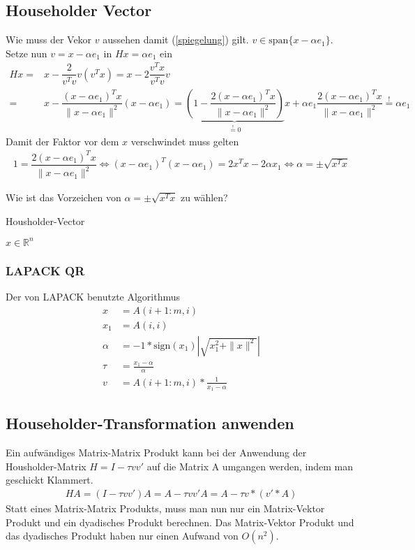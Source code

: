 \subsection{Householder Vector}
Wie muss der Vekor $v$ aussehen damit (\ref{spiegelung}) gilt. $v \in \text{span}\{x - \alpha e_1\}$. Setze nun $v = x - \alpha e_1$ in $Hx = \alpha e_1 $ ein
\begin{align*}
	Hx =& x - \dfrac{2}{v^Tv}v(v^Tx) = x - 2\dfrac{v^Tx}{v^Tv}v\\
	=& x - \dfrac{(x - \alpha e_1)^Tx}{\|x - \alpha e_1\|^2} (x - \alpha e_1)
	=\underbrace{\left(1 - \dfrac{2(x - \alpha e_1)^Tx}{\|x - \alpha e_1\|^2}\right)}_{ \overset{!}{=} 0 } x + \alpha e_1 \dfrac{2(x - \alpha e_1)^Tx}{\|x - \alpha e_1\|^2}  \overset{!}{=} \alpha e_1
\end{align*}
Damit der Faktor vor dem $x$ verschwindet muss gelten
\begin{align*}
	1 = \dfrac{2(x - \alpha e_1)^Tx}{\|x - \alpha e_1\|^2} \Leftrightarrow (x - \alpha e_1)^T(x - \alpha e_1) = 2 x^T x - 2\alpha x_1 \Leftrightarrow \alpha = \pm \sqrt{x^Tx}
\end{align*}

Wie ist das Vorzeichen von $\alpha = \pm \sqrt{x^Tx}$ zu wählen?


\begin{algorithm}
	\caption{Housholder-Vector}
	\begin{algorithmic}
		\State $x \in \mathbb{R}^n$
	\end{algorithmic} 
	\label{alg:unblockedqr}
\end{algorithm}

\subsubsection{LAPACK QR}
Der von LAPACK benutzte Algorithmus \cite{DGEQR2}
\begin{align*}
x &= A(i+1:m,i)\\
x_1 &= A(i,i)\\
\alpha &= -1 * \text{sign}(x_1) \left|\sqrt{x_1^2 + \|x\|^2}\right|\\
\tau &= \frac{x_1 - \alpha}{\alpha} \\
v &= A(i+1:m,i) * \frac{1}{x_1 - \alpha}
\end{align*}



\subsection{Householder-Transformation anwenden}
Ein aufwändiges Matrix-Matrix Produkt kann bei der Anwendung der Housholder-Matrix $H = I - \tau vv'$ auf die Matrix A umgangen werden, indem man geschickt Klammert.
\begin{align*} 
H A =(I - \tau vv') A= A - \tau vv' A = A - \tau v*(v'*A)
\end{align*}
Statt eines Matrix-Matrix Produkts, muss man nun nur ein Matrix-Vektor Produkt und ein dyadisches Produkt berechnen.
Das Matrix-Vektor Produkt und das dyadisches Produkt haben nur einen Aufwand von $O(n^2)$.




